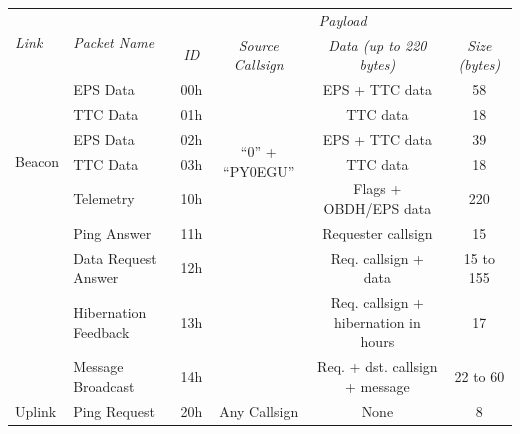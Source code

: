 \begin{landscape}
    \begin{table}[ht]
        \centering
        \begin{tabular}{llcccc}
            \toprule[1.5pt]
            \multirow{2}{*}{\textit{Link}} & \multirow{2}{*}{\textit{Packet Name}} & \multicolumn{4}{c}{\textit{Payload}} \\
            \cmidrule{3-6}
                                      &                       & \textit{ID}  & \textit{Source Callsign}   & \textit{Data (up to 220 bytes)}            & \textit{Size (bytes)} \\
            \midrule
            \multirow{6}{*}{Beacon}   & EPS Data              & 00h & \multirow{6}{*}{``0'' + ``PY0EGU''} & EPS + TTC data                             & 58           \\
                                      & TTC Data              & 01h &                                     & TTC data                                   & 18           \\
                                      & EPS Data              & 02h &                                     & EPS + TTC data                             & 39           \\
                                      & TTC Data              & 03h &                                     & TTC data                                   & 18           \\
            \midrule
            \multirow{6}{*}{Downlink} & Telemetry             & 10h & \multirow{6}{*}{``0'' + ``PY0EGU''} & Flags + OBDH/EPS data                      & 220          \\
                                      & Ping Answer           & 11h &                                     & Requester callsign                         & 15           \\
                                      & Data Request Answer   & 12h &                                     & Req. callsign + data                       & 15 to 155    \\
                                      & Hibernation Feedback  & 13h &                                     & Req. callsign + hibernation in hours       & 17           \\
                                      & Message Broadcast     & 14h &                                     & Req. + dst. callsign + message             & 22 to 60     \\
            \midrule
            \multirow{3}{*}{Uplink}   & Ping Request          & 20h & \multirow{3}{*}{Any Callsign}       & None                                       & 8            \\

\end{tabular}
\end{table}
\end{landscape}
